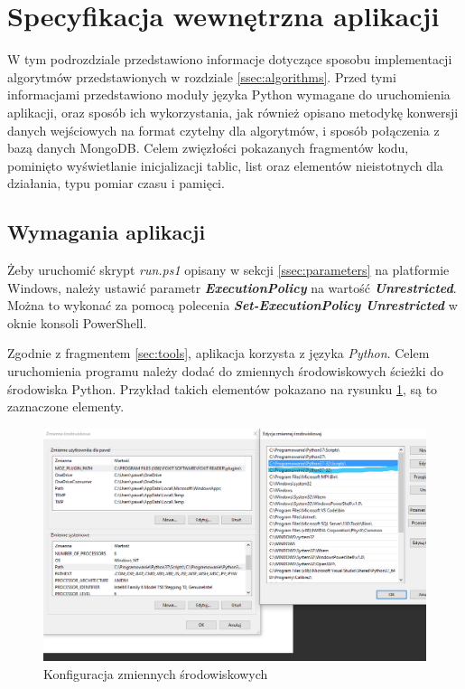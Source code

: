 \section{Specyfikacja wewnętrzna aplikacji}
\label{sec:internal}
W tym podrozdziale przedstawiono informacje dotyczące sposobu implementacji algorytmów przedstawionych w rozdziale \ref{ssec:algorithms}. Przed tymi informacjami przedstawiono moduły języka Python wymagane do uruchomienia aplikacji, oraz sposób ich wykorzystania, jak również opisano metodykę konwersji danych wejściowych na format czytelny dla algorytmów, i sposób połączenia z bazą danych MongoDB. Celem zwięzłości pokazanych fragmentów kodu, pominięto wyświetlanie inicjalizacji tablic, list oraz elementów nieistotnych dla działania, typu pomiar czasu i pamięci.
\subsection{Wymagania aplikacji}
\label{ssec:apprequirements}
Żeby uruchomić skrypt \emph{run.ps1} opisany w sekcji \ref{ssec:parameters} na platformie Windows, należy ustawić parametr \emph{\textbf{ExecutionPolicy}} na wartość \emph{\textbf{Unrestricted}}. Można to wykonać za pomocą polecenia \emph{\textbf{Set-ExecutionPolicy Unrestricted}} w oknie konsoli PowerShell.\par
Zgodnie z fragmentem \ref{sec:tools}, aplikacja korzysta z języka \emph{Python}. Celem uruchomienia programu należy dodać do zmiennych środowiskowych ścieżki do środowiska Python. Przykład takich elementów pokazano na rysunku \ref{fig:path}, są to zaznaczone elementy.
\begin{figure}[H]
        \centering
        \captionsetup{justification=centering,margin=2cm}
        \includegraphics[width=\linewidth]{resources/path.png}
        \caption{Konfiguracja zmiennych środowiskowych}
        \label{fig:path}
\end{figure}

